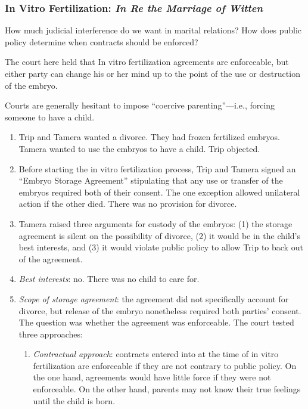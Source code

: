 \subsubsection{In Vitro Fertilization: \emph{In Re the Marriage of Witten}}

How much judicial interference do we want in marital relations? How does 
public policy determine when contracts should be enforced?

The court here held that In vitro fertilization agreements are enforceable, 
but either party can change his or her mind up to the point of the use or 
destruction of the embryo.

Courts are generally hesitant to impose ``coercive parenting''---i.e., forcing 
someone to have a child.

\begin{enumerate}
    \item Trip and Tamera wanted a divorce. They had frozen fertilized 
    embryos. Tamera wanted to use the embryos to have a child. Trip objected.
    \item Before starting the in vitro fertilization process, Trip and Tamera 
    signed an ``Embryo Storage Agreement'' stipulating that any use or 
    transfer of the embryos required both of their consent. The one exception 
    allowed unilateral action if the other died. There was no provision for 
    divorce.
    \item Tamera raised three arguments for custody of the embryos: (1) the 
    storage agreement is silent on the possibility of divorce, (2) it would be 
    in the child's best interests, and (3) it would violate public policy to 
    allow Trip to back out of the agreement.
    \item \emph{Best interests}: no. There was no child to care for.
    \item \emph{Scope of storage agreement}: the agreement did not 
    specifically account for divorce, but release of the embryo nonetheless 
    required both parties' consent. The question was whether the agreement was 
    enforceable. The court tested three approaches:
    \begin{enumerate}
        \item \emph{Contractual approach}: contracts entered into at the time 
        of in vitro fertilization are enforceable if they are not contrary to 
        public policy. On the one hand, agreements would have little force if 
        they were not enforceable. On the other hand, parents may not know 
        their true feelings until the child is born.

\end{enumerate}
\end{enumerate}
